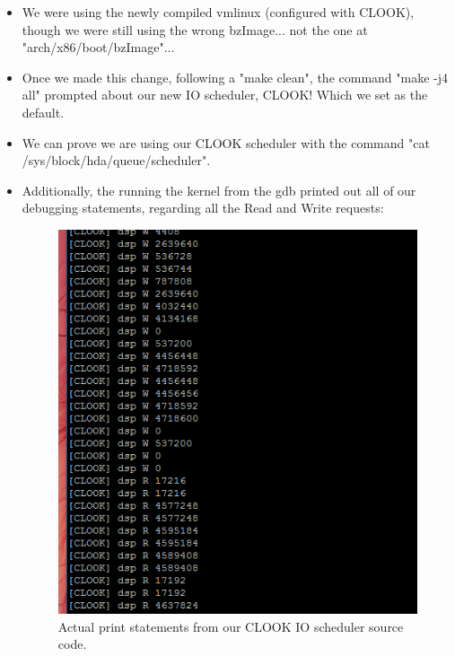 \documentclass[letterpaper,10pt,onecolumn]{IEEEtran}
\begin{document}
\begin{itemize}
            \begin{itemize} 
                \item We were using the newly compiled vmlinux (configured with CLOOK), though we were still using the wrong bzImage... not the one at "arch/x86/boot/bzImage"...
        	    \item Once we made this change, following a "make clean", the command "make -j4 all" prompted about our new IO scheduler, CLOOK! Which we set as the default.
        	    \item We can prove we are using our CLOOK scheduler with the command "cat /sys/block/hda/queue/scheduler".
        	    \item Additionally, the running the kernel from the gdb printed out all of our debugging statements, regarding all the Read and Write requests:   
        	    \vspace{2mm}
        	    \begin{figure}[h]
                    \centering
                    \includegraphics[scale=0.75]{clook_output}
                    \captionsetup{justification=centering}
                    \caption{Actual print statements from our CLOOK IO scheduler source code.}
                \end{figure}
        	\end{itemize}
    \end{itemize}
    
\end{document}
